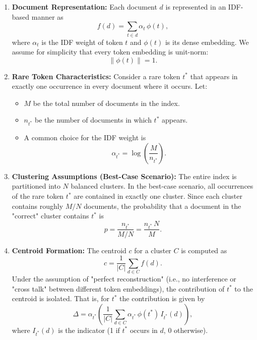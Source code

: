 \documentclass[manuscript]{acmart}
\begin{document}
\begin{enumerate}
\item \textbf{Document Representation:} Each document $d$ is represented in an IDF-based manner as
\begin{equation}
f(d) = \sum_{t\in d} \alpha_t\, \phi(t),
\end{equation}
where $\alpha_t$ is the IDF weight of token $t$ and $\phi(t)$ is its dense embedding. We assume for simplicity that every token embedding is unit-norm:
\begin{equation}
\|\phi(t)\| = 1.
\end{equation}

\item \textbf{Rare Token Characteristics:} Consider a rare token $t^*$ that appears in exactly one occurrence in every document where it occurs. Let:
\begin{itemize}
\item $M$ be the total number of documents in the index.
\item $n_{t^*}$ be the number of documents in which $t^*$ appears.
\item A common choice for the IDF weight is
\begin{equation}
\alpha_{t^*} = \log\!\left(\frac{M}{n_{t^*}}\right).
\end{equation}
\end{itemize}

\item \textbf{Clustering Assumptions (Best-Case Scenario):} The entire index is partitioned into $N$ balanced clusters. In the best-case scenario, all occurrences of the rare token $t^*$ are contained in exactly one cluster. Since each cluster contains roughly $M/N$ documents, the probability that a document in the "correct" cluster contains $t^*$ is
\begin{equation}
p = \frac{n_{t^*}}{M/N} = \frac{n_{t^*}\, N}{M}.
\end{equation}

\item \textbf{Centroid Formation:} The centroid $c$ for a cluster $C$ is computed as
\begin{equation}
c = \frac{1}{|C|}\sum_{d\in C} f(d).
\end{equation}
Under the assumption of "perfect reconstruction" (i.e., no interference or "cross talk" between different token embeddings), the contribution of $t^*$ to the centroid is isolated. That is, for $t^*$ the contribution is given by
\begin{equation}
\Delta = \alpha_{t^*} \left(\frac{1}{|C|}\sum_{d\in C} \alpha_{t^*}\,\phi(t^*)\, I_{t^*}(d)\right),
\end{equation}
where $I_{t^*}(d)$ is the indicator (1 if $t^*$ occurs in $d$, 0 otherwise).


\end{enumerate}
\end{document}
